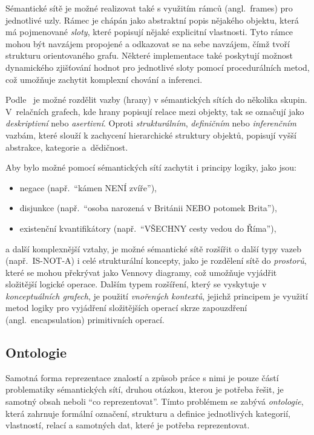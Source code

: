Sémantické sítě je možné realizovat také s využitím rámců (angl.~frames) pro jednotlivé uzly.
Rámec je chápán jako abstraktní popis nějakého objektu, která má pojmenované \emph{sloty}, které popisují nějaké explicitní vlastnosti.
Tyto rámce mohou být navzájem propojené a odkazovat se na sebe navzájem, čímž tvoří strukturu orientovaného grafu.
Některé implementace také poskytují možnost dynamického zjišťování hodnot pro jednotlivé sloty pomocí procedurálních metod,
což umožňuje zachytit komplexní chování a inferenci.~\cite{semantic-nets-LEHMANN19921}

Podle~\cite{semantic-nets-LEHMANN19921} je možné rozdělit vazby (hrany) v sémantických sítích do několika skupin.
V~relačních grafech, kde hrany popisují relace mezi objekty, tak se označují jako \emph{deskriptivní} nebo \emph{asertivní}.
Oproti \emph{strukturálním}, \emph{definičním} nebo \emph{inferenčním} vazbám, které slouží k zachycení hierarchické struktury objektů,
popisují vyšší abstrakce, kategorie a~dědičnost.~\cite{semantic-nets-LEHMANN19921}

Aby bylo možné pomocí sémantických sítí zachytit i principy logiky, jako jsou:
\begin{itemize}
	\item negace (např.~\enquote{kámen NENÍ zvíře}),
	\item disjunkce (např.~\enquote{osoba narozená v Británii NEBO potomek Brita}),
	\item existenční kvantifikátory (např.~\enquote{VŠECHNY cesty vedou do Říma}),
\end{itemize}
a další komplexnější vztahy, je možné sémantické sítě rozšířit o další typy vazeb (např.~IS-NOT-A) i celé strukturální koncepty,
jako je rozdělení sítě do \emph{prostorů}, které se mohou překrývat jako Vennovy diagramy, což umožňuje vyjádřit složitější logické operace.
Dalším typem rozšíření, který se vyskytuje v \emph{konceptuálních grafech}, je použití \emph{vnořených kontextů},
jejichž principem je využití metod logiky pro vyjádření složitějších operací skrze zapouzdření (angl.~encapsulation) primitivních operací.~\cite{semantic-nets-LEHMANN19921}

\subsection{Ontologie}
Samotná forma reprezentace znalostí a způsob práce s nimi je pouze částí problematiky sémantických sítí,
druhou otázkou, kterou je potřeba řešit, je samotný obsah neboli \enquote{co reprezentovat}.
Tímto problémem se zabývá \emph{ontologie}, která zahrnuje formální označení, strukturu a definice jednotlivých kategorií,
vlastností, relací a samotných dat, které je potřeba reprezentovat.


